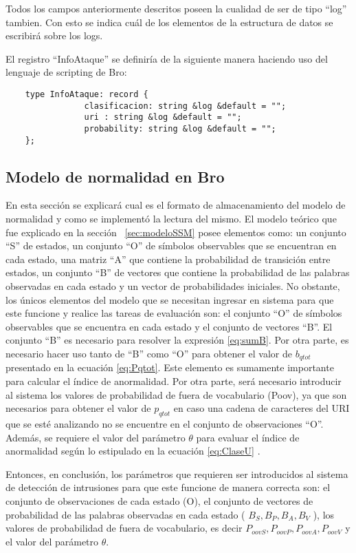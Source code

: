 Todos los campos anteriormente descritos poseen la cualidad de ser de tipo “log” tambien. Con esto se indica cuál de los elementos de la estructura de datos se escribirá sobre los logs.

    El registro “InfoAtaque” se definiría de la siguiente manera haciendo uso del lenguaje de scripting de Bro:

\begin{verbatim}
    type InfoAtaque: record {
                clasificacion: string &log &default = "";
                uri : string &log &default = "";
                probability: string &log &default = "";
    }; 
\end{verbatim}

\subsection{Modelo de normalidad en Bro}
\label{sec:lecturaModelo}
En esta sección se explicará cual es el formato de almacenamiento del modelo de normalidad y como se implementó la lectura del mismo. El modelo teórico que fue explicado en la sección ~\ref{sec:modeloSSM} posee elementos como: un conjunto “S” de estados, un conjunto “O” de símbolos observables que se encuentran en cada estado, una matriz “A” que contiene la probabilidad de transición entre estados, un conjunto “B” de vectores que contiene la probabilidad de las palabras observadas en cada estado y un vector de probabilidades iniciales. No obstante, los únicos elementos del modelo que se necesitan ingresar en sistema para que este funcione y realice las tareas de evaluación son: el conjunto “O” de símbolos observables que se encuentra en cada estado y el conjunto de vectores “B”. El conjunto “B” es necesario para resolver la expresión \ref{eq:sumB}. Por otra parte, es necesario hacer uso tanto de “B” como “O” para obtener el valor de $b_{qtot}$ presentado en la ecuación \ref{eq:Pqtot}. Este elemento es sumamente importante para calcular el índice de anormalidad. Por otra parte, será necesario introducir al sistema los valores de probabilidad de fuera de vocabulario (Poov), ya que son necesarios para obtener el valor de $p_{qtot}$ en caso una cadena de caracteres del URI que se esté analizando no se encuentre en el conjunto de observaciones “O”. Además, se requiere el valor del parámetro $\theta$ para evaluar el índice de anormalidad según lo estipulado en la ecuación \ref{eq:ClaseU} .

    Entonces, en conclusión, los parámetros que requieren ser introducidos al sistema de detección de intrusiones para que este funcione de manera correcta son: el conjunto de observaciones de cada estado (O), el conjunto de vectores de probabilidad de las palabras observadas en cada estado ( $B_{S}, B_{P}, B_{A}, B_{V}$ ), los valores de probabilidad de fuera de vocabulario, es decir $P_{oovS}, P_{oovP}, P_{oovA}, P_{oovV}$ y el valor del parámetro $\theta$.

